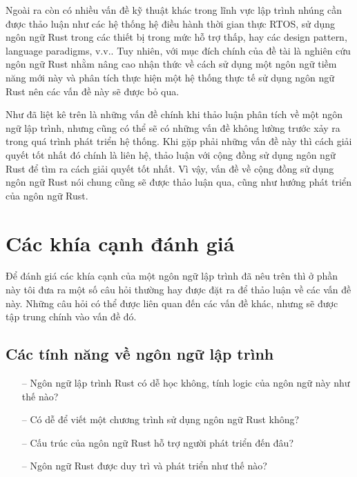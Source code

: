 Ngoài ra còn có nhiều vấn đề kỹ thuật khác trong lĩnh vực lập trình nhúng cần được thảo luận như các hệ thống hệ điều hành thời gian thực RTOS, sử dụng ngôn ngữ Rust trong các thiết bị trong mức hỗ trợ thấp, hay các design pattern, language paradigms, v.v..
Tuy nhiên, với mục đích chính của đề tài là nghiên cứu ngôn ngữ Rust nhằm nâng cao nhận thức về cách sử dụng một ngôn ngữ tiềm năng mới này và phân tích thực hiện một hệ thống thực tế sử dụng ngôn ngữ Rust nên các vấn đề này sẽ được bỏ qua.

Như đã liệt kê trên là những vấn đề chính khi thảo luận phân tích về một ngôn ngữ lập trình, nhưng cũng có thể sẽ có những vấn đề không lường trước xảy ra trong quá trình phát triển hệ thống.
Khi gặp phải những vấn đề này thì cách giải quyết tốt nhất đó chính là liên hệ, thảo luận với cộng đồng sử dụng ngôn ngữ Rust để tìm ra cách giải quyết tốt nhất.
Vì vậy, vấn đề về cộng đồng sử dụng ngôn ngữ Rust nói chung cũng sẽ được thảo luận qua, cũng như hướng phát triển của ngôn ngữ Rust.

\section{Các khía cạnh đánh giá}\label{lbl:quality}
Để đánh giá các khía cạnh của một ngôn ngữ lập trình đã nêu trên thì ở phần này tôi đưa ra một số câu hỏi thường hay được đặt ra để thảo luận về các vấn đề này. Những câu hỏi có thể được liên quan đến các vấn đề khác, nhưng sẽ được tập trung chính vào vấn đề đó.
\subsection{Các tính năng về ngôn ngữ lập trình}
\begin{itemize}
    \item[--] Ngôn ngữ lập trình Rust có dễ học không, tính logic của ngôn ngữ này như thế nào?
    \item[--] Có dễ để viết một chương trình sử dụng ngôn ngữ Rust không?
    \item[--] Cấu trúc của ngôn ngữ Rust hỗ trợ người phát triển đến đâu?
    \item[--] Ngôn ngữ Rust được duy trì và phát triển như thế nào?
\end{itemize}

